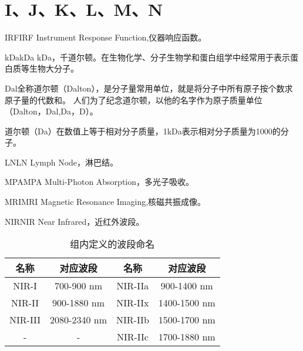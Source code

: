 \documentclass[cn,11pt,chinese]{elegantbook}
\begin{document}
\section{I、J、K、L、M、N}

\begin{theorem}{IRF}{IRF} 
  Instrument Response Function,仪器响应函数。
\end{theorem}

\begin{theorem}{kDa}{kDa} 
  kDa，千道尔顿。在生物化学、分子生物学和蛋白组学中经常用于表示蛋白质等生物大分子。

Dal全称道尔顿（Dalton），是分子量常用单位，就是将分子中所有原子按个数求原子量的代数和。
人们为了纪念道尔顿，以他的名字作为原子质量单位（Dalton，Dal,Da，D）。

道尔顿（Da）在数值上等于相对分子质量，1kDa表示相对分子质量为1000的分子。
\end{theorem}

\begin{theorem}{LN}{LN} 
  Lymph Node，淋巴结。
   \end{theorem}

\begin{theorem}{MPA}{MPA} 
Multi-Photon Absorption，多光子吸收。
 \end{theorem}

 \begin{theorem}{MRI}{MRI} 
  Magnetic Resonance Imaging,核磁共振成像。
   \end{theorem}

\begin{theorem}{NIR}{NIR} 
 Near Infrared，近红外波段。
\end{theorem}

\begin{table}[!htb]
  \centering
  \caption{组内定义的波段命名}
    \begin{tabular}{cc||cc}
    \hline
    \textbf{名称} & \textbf{对应波段} & \textbf{名称} & \textbf{对应波段}  \\
    \hline
    NIR-I  & 700-900 nm & NIR-IIa & 900-1400 nm     \\  
    NIR-II  & 900-1880 nm & NIR-IIx & 1400-1500 nm     \\  
    NIR-III  & 2080-2340 nm & NIR-IIb & 1500-1700 nm     \\  
    -  & - & NIR-IIc & 1700-1880 nm     \\  
    \hline
    \end{tabular}%
  \label{tab:NIR}%
\end{table}%
\end{document}

